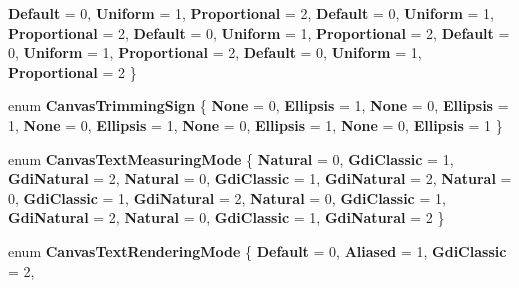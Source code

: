 \begin{DoxyCompactItemize}
{\bfseries Default} = 0, 
{\bfseries Uniform} = 1, 
{\bfseries Proportional} = 2, 
{\bfseries Default} = 0, 
\newline
{\bfseries Uniform} = 1, 
{\bfseries Proportional} = 2, 
{\bfseries Default} = 0, 
{\bfseries Uniform} = 1, 
\newline
{\bfseries Proportional} = 2, 
{\bfseries Default} = 0, 
{\bfseries Uniform} = 1, 
{\bfseries Proportional} = 2, 
\newline
{\bfseries Default} = 0, 
{\bfseries Uniform} = 1, 
{\bfseries Proportional} = 2
 \}
\item 
\mbox{\label{namespace_microsoft_1_1_graphics_1_1_canvas_1_1_text_a891e2d3429f4e8717d79bdd171ed64a0}} 
enum {\bfseries Canvas\+Trimming\+Sign} \{ \newline
{\bfseries None} = 0, 
{\bfseries Ellipsis} = 1, 
{\bfseries None} = 0, 
{\bfseries Ellipsis} = 1, 
\newline
{\bfseries None} = 0, 
{\bfseries Ellipsis} = 1, 
{\bfseries None} = 0, 
{\bfseries Ellipsis} = 1, 
\newline
{\bfseries None} = 0, 
{\bfseries Ellipsis} = 1
 \}
\item 
\mbox{\label{namespace_microsoft_1_1_graphics_1_1_canvas_1_1_text_a3496181b6d55fc9dc4eeaff916dc841f}} 
enum {\bfseries Canvas\+Text\+Measuring\+Mode} \{ \newline
{\bfseries Natural} = 0, 
{\bfseries Gdi\+Classic} = 1, 
{\bfseries Gdi\+Natural} = 2, 
{\bfseries Natural} = 0, 
\newline
{\bfseries Gdi\+Classic} = 1, 
{\bfseries Gdi\+Natural} = 2, 
{\bfseries Natural} = 0, 
{\bfseries Gdi\+Classic} = 1, 
\newline
{\bfseries Gdi\+Natural} = 2, 
{\bfseries Natural} = 0, 
{\bfseries Gdi\+Classic} = 1, 
{\bfseries Gdi\+Natural} = 2, 
\newline
{\bfseries Natural} = 0, 
{\bfseries Gdi\+Classic} = 1, 
{\bfseries Gdi\+Natural} = 2
 \}
\item 
\mbox{\label{namespace_microsoft_1_1_graphics_1_1_canvas_1_1_text_a334e63f588579a4be3880313d6dabd2d}} 
enum {\bfseries Canvas\+Text\+Rendering\+Mode} \{ \newline
{\bfseries Default} = 0, 
{\bfseries Aliased} = 1, 
{\bfseries Gdi\+Classic} = 2, 

\end{DoxyCompactItemize}
